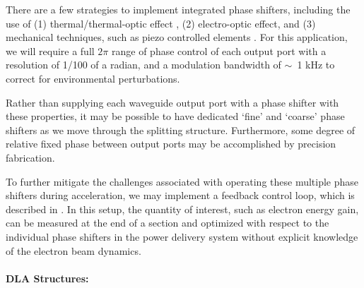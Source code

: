 There are a few strategies to implement integrated phase shifters, including the use of (1) thermal/thermal-optic effect \cite{kwong20111,kwong2014chip}, (2) electro-optic effect, and (3) mechanical techniques, such as piezo controlled elements \cite{poot2014broadband}.
For this application, we will require a full $2\pi$ range of phase control of each output port with a resolution of 1/100 of a radian, and a modulation bandwidth of $\sim$~1 kHz to correct for environmental perturbations.

Rather than supplying each waveguide output port with a phase shifter with these properties, it may be possible to have dedicated `fine' and `coarse' phase shifters as we move through the splitting structure.
Furthermore, some degree of relative fixed phase between output ports may be accomplished by precision fabrication.


To further mitigate the challenges associated with operating these multiple phase shifters during acceleration, we may implement a feedback control loop, which is described in .
In this setup, the quantity of interest, such as electron energy gain, can be measured at the end of a section and optimized with respect to the individual phase shifters in the power delivery system without explicit knowledge of the electron beam dynamics.

\paragraph{DLA Structures:}


